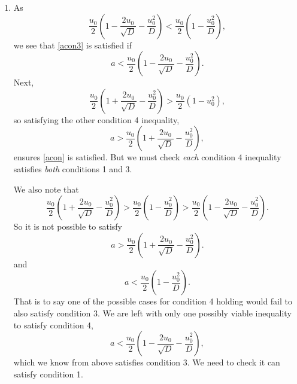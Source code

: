 \documentclass[a4paper, 12pt]{article}
\begin{document}
\begin{enumerate}[label={\bf \arabic{*}.\;}, ref={\arabic{*}},itemsep=3ex, left=0ex]
{\begin{enumerate}[label=(\alph*)]
{              The third condition gives
              \begin{equation}
                \label{acon3}
                D(1-\frac{2a}{u_0}) -u_0^2\implies a<\frac{u_0}{2}\left(1-\frac{u_0^2}{D}\right).
              \end{equation}
            }
          \item{
              As
              \begin{equation}
                \frac{u_0}{2}\left(1-\frac{2u_0}{\sqrt{D}} -\frac{u_0^2}{D}\right)<  \frac{u_0}{2}\left(1-\frac{u_0^2}{D}\right),
              \end{equation}
              we see that \cref{acon3} is satisfied if
              \begin{equation}
                a<  \frac{u_0}{2}\left(1-\frac{2u_0}{\sqrt{D}} -\frac{u_0^2}{D}\right).
              \end{equation}
              Next,
              \begin{equation}
                \frac{u_0}{2}\left(1+\frac{2u_0}{\sqrt{D}} -\frac{u_0^2}{D}\right) > \frac{u_0}{2}\left(1-u_0^2\right),
              \end{equation}
              so satisfying the other condition 4 inequality,
              \begin{equation}
                a> \frac{u_0}{2}\left(1+\frac{2u_0}{\sqrt{D}} -\frac{u_0^2}{D}\right),
              \end{equation}
              ensures \cref{acon} is satisfied. But we must check \emph{each} condition 4 inequality satisfies \emph{both} conditions 1 and 3.

              We also note that
              \begin{equation}
                \frac{u_0}{2}\left(1+\frac{2u_0}{\sqrt{D}} -\frac{u_0^2}{D}\right) >   \frac{u_0}{2}\left(1-\frac{u_0^2}{D}\right)> \frac{u_0}{2}\left(1-\frac{2u_0}{\sqrt{D}} -\frac{u_0^2}{D}\right).
              \end{equation}
              So it is not possible to satisfy
              \begin{equation}
                a>   \frac{u_0}{2}\left(1+\frac{2u_0}{\sqrt{D}} -\frac{u_0^2}{D}\right).
              \end{equation}
              and
              \begin{equation}
                a<\frac{u_0}{2}\left(1-\frac{u_0^2}{D}\right).
              \end{equation}
              That is to say one of the possible cases for condition 4 holding would fail to also satisfy condition 3. We are left with only one possibly viable inequality to satisfy condition 4,
              \begin{equation}
                a< \frac{u_0}{2}\left(1-\frac{2u_0}{\sqrt{D}} -\frac{u_0^2}{D}\right),
              \end{equation}
              which we know from above satisfies condition 3. We need to check it can satisfy condition 1.

}
\end{enumerate}}
\end{enumerate}
\end{document}
